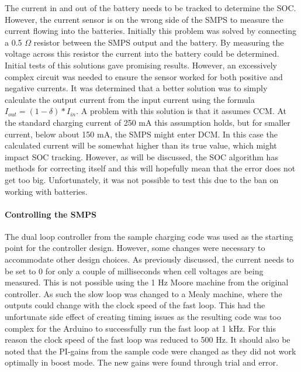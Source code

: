 \documentclass[a4paper]{article}
\begin{document}
The current in and out of the battery needs to be tracked to determine 
the SOC. However, the current sensor is on the wrong side of the SMPS 
to measure the current flowing into the batteries. Initially this 
problem was solved by connecting a 0.5 $\Omega$ resistor between the 
SMPS output and the battery. By measuring the voltage across this 
resistor the current into the battery could be determined. Initial 
tests of this solutions gave promising results. However, an excessively 
complex circuit was needed to ensure the sensor worked for both positive 
and negative currents. It was determined that a better solution was to 
simply calculate the output current from the input current using the 
formula \( I_{out} = (1 - \delta)*I_{in} \). A problem with this solution 
is that it assumes CCM. At the standard charging current of 250 mA this 
assumption holds, but for smaller current, below about 150 mA, the SMPS 
might enter DCM. In this case the calculated current will be somewhat 
higher than its true value, which might impact SOC tracking. However, 
as will be discussed, the SOC algorithm has methods for correcting 
itself and this will hopefully mean that the error does not get too 
big. Unfortunately, it was not possible to test this due to the ban 
on working with batteries.  

\paragraph*{Controlling the SMPS}
The dual loop controller from the sample charging code\cite{chargeCode} was 
used as the starting point for the controller design. However, some 
changes were necessary to accommodate other design choices. As previously 
discussed, the current needs to be set to 0 for only a couple of 
milliseconds when cell voltages are being measured. This is not 
possible using the 1 Hz Moore machine from the original controller. 
As such the slow loop was changed to a Mealy machine, where the 
outputs could change with the clock speed of the fast loop. This had the 
unfortunate side effect of creating timing issues as the resulting 
code was too complex for the Arduino to successfully run the fast 
loop at 1 kHz. For this reason the clock speed of the fast loop was 
reduced to 500 Hz. It should also be noted that the PI-gains from 
the sample code were changed as they did not work optimally in boost 
mode. The new gains were found through trial and error.
\end{document}
